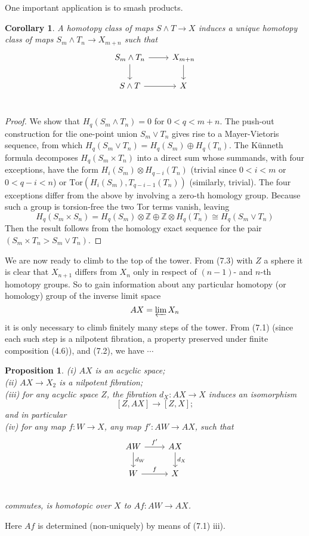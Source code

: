 \documentclass[openany,leqno]{book}  %
\newcommand{\tor}{\mathrm{Tor}}
\newcommand{\Z}{\mathbb{Z}}
\newtheorem{prop}[theorem]{Proposition}
\newtheorem{corollary}[theorem]{Corollary}
\begin{document}
One important application is to smash products.
\begin{corollary}
  A homotopy class of maps $S\wedge T \longrightarrow X$ induces a unique homotopy class of maps $S_m \wedge T_n\rightarrow X_{m+n}$ such that
  \[
\begin{tikzcd}
S_m \wedge T_n \arrow[r] \arrow[d] & X_{m+n} \arrow[d]\\
S\wedge T \arrow{r} & X\\
\end{tikzcd}
  \]
\end{corollary}
\begin{proof}
 We show that $H_q(S_m \wedge T_n) = 0$ for $0 < q < m+n$. The push-out construction for tlie one-point union $S_m \vee T_n$ gives rise to a Mayer-Vietoris sequence, from which $H_q(S_m\vee T_n) = H_q(S_m) \oplus H_q(T_n)$. The K\"{u}nneth formula decomposes $H_q(S_m\times T_n)$ into a direct sum whose summands, with four exceptions, have the form $H_i(S_m) \otimes H_{q-i}(T_n)$ (trivial since $0 < i < m$ or $0 < q-i < n$) or $\tor (H_i(S_m ), T_{q-i-1}(T_n))$ (similarly, trivial). The four exceptions differ from the above by involving a zero-th homology group. Because such a group is torsion-free the two Tor terms vanish, leaving
 \[H_q(S_m\times S_n) = H_q(S_m)\otimes \Z \oplus \Z \otimes H_q(T_n)\cong H_q(S_m\vee T_n)\]
Then the result follows from the homology exact sequence for the pair $(S_m\times T_n> S_m\vee T_n)$.
 \end{proof}
  
We are now ready to climb to the top of the tower. From (7.3) with $Z$ a sphere it is clear that $X_{n+1}$ differs from $X_n$ only in respect of $(n-1)$- and $n$-th homotopy groups. So to gain information about any particular homotopy (or homology) group of the inverse limit space
\[AX = \varprojlim X_n\]
it is only necessary to climb finitely many steps of the tower. From (7.1) (since each such step is a nilpotent fibration, a property preserved under finite composition (4.6)), and (7.2), we have $\cdots$
\begin{prop}
  (i) $AX$ is an acyclic space; \\
(ii) $AX \longrightarrow X_2$ is a nilpotent fibration;\\
(iii) for any acyclic space $Z$, the fibration $d_X \colon  AX\longrightarrow X$ induces an isomorphism 
\[[Z,AX] \longrightarrow [Z,X];\]
and in particular\\
(iv) for any map $f \colon   W \longrightarrow X$, any map $f' \colon   AW\longrightarrow AX$, such that
  \[
\begin{tikzcd}
AW \arrow[r,"f'"] \arrow[d,"d_W"] & AX \arrow[d,"d_X"]\\
W \arrow{r}{f} & X\\
\end{tikzcd}
  \]
commutes, is homotopic over $X$ to $Af\colon   AW \longrightarrow AX$.
\end{prop}
Here $Af$ is determined (non-uniquely) by means of (7.1) iii).
\end{document}
